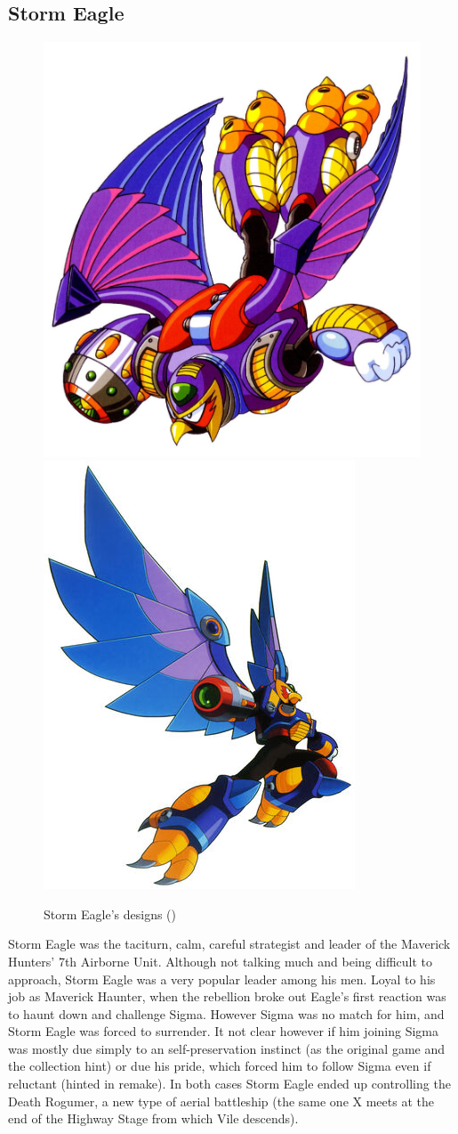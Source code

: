  \subsection{Storm Eagle}\label{boss:Storm_Eagle}
 \begin{figure}[htp]
 	\centering
 	\includegraphics[width=0.4\linewidth]{figures/X1/Storm_eagle/Storm_Eagle.jpg}
 	\includegraphics[width=0.4\linewidth]{figures/X1/Storm_eagle/MHXStormEagle.jpg}
 	\caption{Storm Eagle's designs (\cite{book:MMX_Complete_art})}
 \end{figure}
 Storm Eagle was the taciturn, calm, careful strategist and leader of the Maverick Hunters' 7th Airborne Unit\cite{wiki:Storm_Eagle}. Although not talking much and being difficult to approach, Storm Eagle was a very popular leader among his men\cite{MHX:manual}. Loyal to his job as Maverick Haunter, when the rebellion broke out Eagle's first reaction was to haunt down and challenge Sigma. However Sigma was no match for him, and Storm Eagle was forced to surrender. It not clear however if him joining Sigma was mostly due simply to an self-preservation instinct (as the original game and the collection hint\cite{Xcoll1:Manual_X1}) or due his pride, which forced him to follow Sigma even if reluctant (hinted in remake). In both cases Storm Eagle ended up controlling the Death Rogumer, a new type of aerial battleship (the same one X meets at the end of the Highway Stage from which Vile descends).
 
